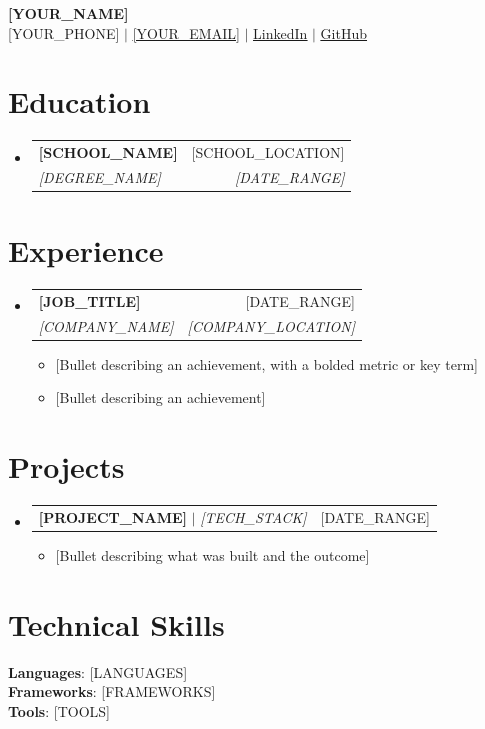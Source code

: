 \documentclass[letterpaper,10pt]{article}
\makeatletter
\newcommand{\resumeItem}[1]{
  \item\small{
    {#1 \vspace{-2pt}}
  }
}
\newcommand{\resumeSubheading}[4]{
  \vspace{-2pt}\item
    \begin{tabular*}{0.97\textwidth}[t]{l@{\extracolsep{\fill}}r}
      \textbf{#1} & #2 \\
      \textit{\small#3} & \textit{\small #4} \\
    \end{tabular*}\vspace{-7pt}
}
\newcommand{\resumeProjectHeading}[2]{
    \item
    \begin{tabular*}{0.97\textwidth}{l@{\extracolsep{\fill}}r}
      \small#1 & #2 \\
    \end{tabular*}\vspace{-7pt}
}
\newcommand{\resumeSubHeadingListStart}{\begin{itemize}[leftmargin=0.15in, label={}]}
\newcommand{\resumeSubHeadingListEnd}{\end{itemize}}
\newcommand{\resumeItemListStart}{\begin{itemize}}
\newcommand{\resumeItemListEnd}{\end{itemize}\vspace{-5pt}}
\makeatother
\begin{document}
\begin{center}
    \textbf{\Huge \scshape [YOUR_NAME]} \\ \vspace{1pt}
    \small [YOUR_PHONE] $|$ \href{mailto:[YOUR_EMAIL]}{\underline{[YOUR_EMAIL]}} $|$
    \href{[YOUR_LINKEDIN_URL]}{\underline{LinkedIn}} $|$
    \href{[YOUR_GITHUB_URL]}{\underline{GitHub}}
\end{center}


\section{Education}
  \resumeSubHeadingListStart
    \resumeSubheading
      {[SCHOOL_NAME]}{[SCHOOL_LOCATION]}
      {[DEGREE_NAME]}{[DATE_RANGE]}
  \resumeSubHeadingListEnd


\section{Experience}
  \resumeSubHeadingListStart

    \resumeSubheading
      {[JOB_TITLE]}{[DATE_RANGE]}
      {[COMPANY_NAME]}{[COMPANY_LOCATION]}
      \resumeItemListStart
        \resumeItem{[Bullet describing an achievement, with a bolded metric or key term]}
        \resumeItem{[Bullet describing an achievement]}
      \resumeItemListEnd

  \resumeSubHeadingListEnd


\section{Projects}
    \resumeSubHeadingListStart
      \resumeProjectHeading
          {\textbf{[PROJECT_NAME]} $|$ \emph{[TECH_STACK]}}{[DATE_RANGE]}
          \resumeItemListStart
            \resumeItem{[Bullet describing what was built and the outcome]}
          \resumeItemListEnd
    \resumeSubHeadingListEnd


\section{Technical Skills}
 \begin{itemize}[leftmargin=0.15in, label={}]
    \small{\item{
     \textbf{Languages}{: [LANGUAGES]} \\
     \textbf{Frameworks}{: [FRAMEWORKS]} \\
     \textbf{Tools}{: [TOOLS]} \\
    }}
 \end{itemize}
\end{document}
